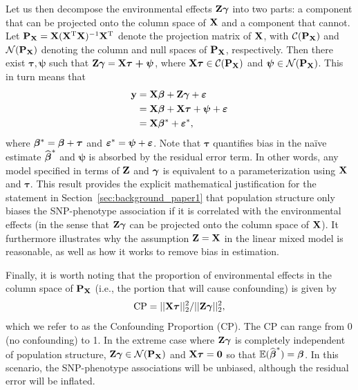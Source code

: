 Let us then decompose the environmental effects $\mathbf{Z} \boldsymbol{\gamma}$ into two parts: a component that can be projected onto the column space of $\mathbf{X}$ and a component that cannot. Let $\mathbf{P}_{\mathbf{X}} = \mathbf{X} (\mathbf{X}^{\text{T}} \mathbf{X})^{-1} \mathbf{X}^{\text{T}}$ denote the projection matrix of $\mathbf{X}$, with $\mathcal{C}(\mathbf{P}_{\mathbf{X}})$ and $\mathcal{N}(\mathbf{P}_{\mathbf{X}})$ denoting the column and null spaces of $\mathbf{P}_{\mathbf{X}}$, respectively. Then there exist $\boldsymbol{\tau}, \boldsymbol{\psi}$ such that $\mathbf{Z} \boldsymbol{\gamma} = \mathbf{X} \boldsymbol{\tau + \psi}$, where $\mathbf{X} \boldsymbol{\tau} \in \mathcal{C}(\mathbf{P}_{\mathbf{X}})$ and $\boldsymbol{\psi} \in \mathcal{N}(\mathbf{P}_{\mathbf{X}})$.  This in turn means that
\begin{equation}
  \begin{aligned}
    \label{eqn:partition_e}
    \mathbf{y} &= \mathbf{X}\boldsymbol{\beta}{} + \mathbf{Z}\boldsymbol{\gamma} + \boldsymbol{\varepsilon}{} \\
    &= \mathbf{X}\boldsymbol{\beta}{} + \mathbf{X} \boldsymbol{\tau} + \boldsymbol{\psi} + \boldsymbol{\varepsilon}{} \\
    &=  \mathbf{X} \boldsymbol{\beta}{}{^*} + \boldsymbol{\varepsilon}{}{^*},
  \end{aligned}
\end{equation}
where $\boldsymbol{\beta}{}^* = \boldsymbol{\beta}{} + \boldsymbol{\tau}$ and $\boldsymbol{\varepsilon}{}{^*} = \boldsymbol{\psi} + \boldsymbol{\varepsilon}{}$.  Note that $\boldsymbol{\tau}$ quantifies bias in the na\"ive estimate $\widehat{\boldsymbol{\beta}{}}^*$ and $\boldsymbol{\psi}$ is absorbed by the residual error term. In other words, any model specified in terms of $\mathbf{Z}$ and $\boldsymbol{\gamma}$ is equivalent to a parameterization using $\mathbf{X}$ and $\boldsymbol{\tau}$.  This result provides the explicit mathematical justification for the statement in Section~\ref{sec:background_paper1} that population structure only biases the SNP-phenotype association if it is correlated with the environmental effects (in the sense that $\mathbf{Z}\boldsymbol{\gamma}$ can be projected onto the column space of $\mathbf{X}$). It furthermore illustrates why the assumption $\mathbf{Z}=\mathbf{X}$ in the linear mixed model is reasonable, as well as how it works to remove bias in estimation.

Finally, it is worth noting that the proportion of environmental effects in the column space of $\mathbf{P}_{\mathbf{X}}$ (i.e., the portion that will cause confounding) is given by
\begin{equation}
    \label{eqn:ratio}
    \text{CP} = ||\mathbf{X} \boldsymbol{\tau}||_2^2 / ||\mathbf{Z} \boldsymbol{\gamma}||_2^2,
\end{equation}
which we refer to as the Confounding Proportion (CP). The CP can range from 0 (no confounding) to 1. In the extreme case where $\mathbf{Z} \boldsymbol{\gamma}$ is completely independent of population structure, $\mathbf{Z} \boldsymbol{\gamma} \in \mathcal{N}(\mathbf{P}_{\mathbf{X}})$ and $\mathbf{X} \boldsymbol{\tau} = \boldsymbol{0}$ so that $\mathbb{E}(\widehat{\boldsymbol{\beta}{}}^*) = \boldsymbol{\beta}{}$. In this scenario, the SNP-phenotype associations will be unbiased, although the residual error will be inflated. 

